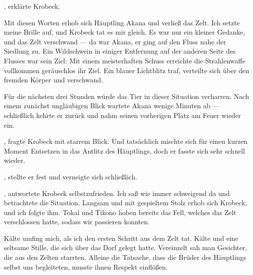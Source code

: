 , erklärte Krobeck.




Mit diesen Worten erhob sich Häuptling Akana und verließ das Zelt. Ich setzte meine Brille auf, und Krobeck tat es mir gleich. Es war nur ein kleiner Gedanke, und das Zelt verschwand --- da war Akana, er ging auf den Fluss nahe der Siedlung zu. Ein Wildschwein in einiger Entfernung auf der anderen Seite des Flusses war sein Ziel: Mit einem meisterhaften Schuss erreichte die Strahlenwaffe vollkommen geräuschlos ihr Ziel. Ein blauer Lichtblitz traf, verteilte sich über den fremden Körper und verschwand.

Für die nächsten drei Stunden würde das Tier in dieser Situation verharren. Nach einem zunächst ungläubigen Blick wartete Akana wenige Minuten ab --- schließlich kehrte er zurück und nahm seinen vorherigen Platz am Feuer wieder ein.

, fragte Krobeck mit starrem Blick. Und tatsächlich mischte sich für einen kurzen Moment Entsetzen in das Antlitz des Häuptlings, doch er fasste sich sehr schnell wieder.

, stellte er fest und verneigte sich schließlich. 

, antwortete Krobeck selbstzufrieden. Ich saß wie immer schweigend da und betrachtete die Situation. Langsam und mit gespieltem Stolz erhob sich Krobeck, und ich folgte ihm. Tokal und Tikono hoben bereits das Fell, welches das Zelt verschlossen hatte, sodass wir passieren konnten.

Kälte umfing mich, als ich den ersten Schritt aus dem Zelt tat. Kälte und eine seltsame Stille, die sich über das Dorf gelegt hatte. Vereinzelt sah man Gesichter, die aus den Zelten starrten. Alleine die Tatsache, dass die Brüder des Häuptlings selbst uns begleiteten, musste ihnen Respekt einflößen.

